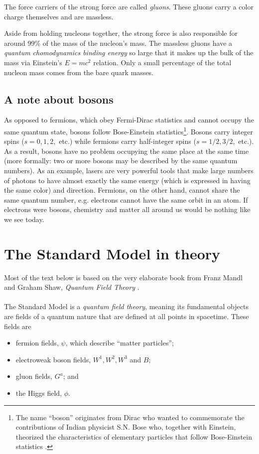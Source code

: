 The force carriers of the strong force are called \textit{gluons}. These gluons carry a color charge themselves and are massless.

Aside from holding nucleons together, the strong force is also responsible for around 99\% of the mass of the nucleon's mass. The massless gluons have a \textit{quantum chomodynamics binding energy} so large that it makes up the bulk of the mass via Einstein's $E=mc^2$ relation. Only a small percentage of the total nucleon mass comes from the bare quark masses.

\subsection{A note about bosons}
As opposed to fermions, which obey Fermi-Dirac statistics and cannot occupy the same quantum state, bosons follow Bose-Einstein statistics\footnote{The name ``boson'' originates from Dirac who wanted to commemorate the contributions of Indian physicist S.N. Bose who, together with Einstein, theorized the characteristics of elementary particles that follow Bose-Einstein statistics \cite{farmelo2009strangest}.}. Bosons carry integer spins ($s=0,1,2,$ etc.) while fermions carry half-integer spins ($s=1/2,3/2,$ etc.). As a result, bosons have no problem occupying the same place at the same time (more formally: two or more bosons may be described by the same quantum numbers). As an example, lasers are very powerful tools that make large numbers of photons to have almost exactly the same energy (which is expressed in having the same color) and direction. Fermions, on the other hand, cannot share the same quantum number, e.g. electrons cannot have the same orbit in an atom. If electrons were bosons, chemistry and matter all around us would be nothing like we see today.

\section{The Standard Model in theory}
\label{sec:sm}
Most of the text below is based on the very elaborate book from Franz Mandl and Graham Shaw, \textit{Quantum Field Theory} \cite{mandl2013quantum}.\\
\\
The Standard Model is a \textit{quantum field theory}, meaning its fundamental objects are fields of a quantum nature that are defined at all points in spacetime. These fields are
\vspace{2mm}
\begin{itemize}
\item fermion fields, $\psi$, which describe ``matter particles'';
\item electroweak boson fields, $W^1, W^2, W^3$ and $B$;
\item gluon fields, $G^a$; and
\item the Higgs field, $\phi$.
\end{itemize}

